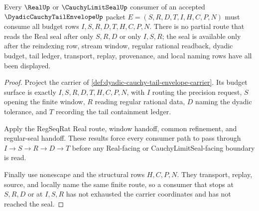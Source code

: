 \begin{theorem}
\label{thm:dyadic-cauchy-tail-envelope-budget-exhaustion}
Every $\RealUp$ or $\CauchyLimitSealUp$ consumer of an accepted $\DyadicCauchyTailEnvelopeUp$ packet $E=(S,R,D,T,I,H,C,P,N)$ must consume all budget rows $I,S,R,D,T,H,C,P,N$. There is no partial route that reads the Real seal after only $S,R,D$ or only $I,S,R$; the seal is available only after the reindexing row, stream window, regular rational readback, dyadic budget, tail ledger, transport, replay, provenance, and local naming rows have all been displayed.
\end{theorem}
\begin{proof}
Project the carrier of \autoref{def:dyadic-cauchy-tail-envelope-carrier}. Its budget surface is exactly $I,S,R,D,T,H,C,P,N$, with $I$ routing the precision request, $S$ opening the finite window, $R$ reading regular rational data, $D$ naming the dyadic tolerance, and $T$ recording the tail containment ledger.

Apply the RegSeqRat Real route, window handoff, common refinement, and regular-seal handoff. These results force every consumer path to pass through $I \longrightarrow S \longrightarrow R \longrightarrow D \longrightarrow T$ before any Real-facing or CauchyLimitSeal-facing boundary is read.

Finally use nonescape and the structural rows $H,C,P,N$. They transport, replay, source, and locally name the same finite route, so a consumer that stops at $S,R,D$ or at $I,S,R$ has not exhausted the carrier coordinates and has not reached the seal.
\end{proof}

